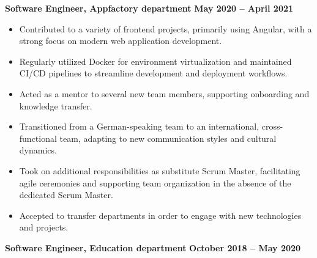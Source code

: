 \documentclass[10pt, a4paper]{cvhari}
\begin{document}
\smallskip
\divider
\smallskip

    \textbf{Software Engineer, Appfactory department} \hfill \textbf{May 2020 -- April 2021}

    \vspace{0.2em}
    \begin{itemize}
        \item Contributed to a variety of frontend projects, primarily using Angular, with a strong focus on modern web application development.

        \item Regularly utilized Docker for environment virtualization and maintained CI/CD pipelines to streamline development and deployment workflows.

        \item Acted as a mentor to several new team members, supporting onboarding and knowledge transfer.

        \item Transitioned from a German-speaking team to an international, cross-functional team, adapting to new communication styles and cultural dynamics.

        \item Took on additional responsibilities as substitute Scrum Master, facilitating agile ceremonies and supporting team organization in the absence of the dedicated Scrum Master.

        \item Accepted to transfer departments in order to engage with new technologies and projects.

    \end{itemize}


\smallskip
\divider
\smallskip

    \textbf{Software Engineer, Education department} \hfill \textbf{October 2018 -- May 2020}
\end{document}

